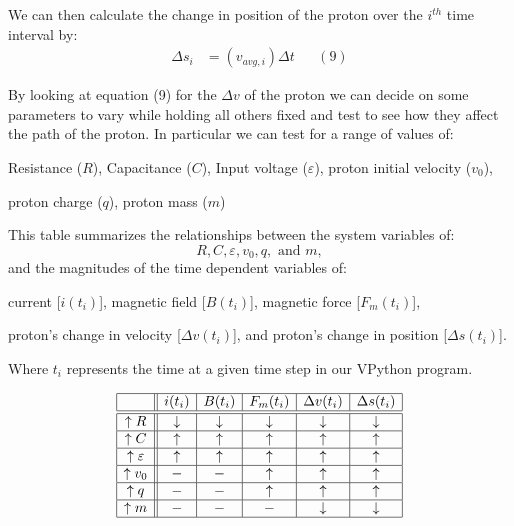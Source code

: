 \documentclass[11pt]{article}
\begin{document}
\vspace{.2in}

\noindent We can then calculate the change in position of the proton over the $i^{th}$ time interval by:
\begin{align*}
\Delta s_i&=\left(v_{avg,i}\right)\Delta t&&(9)
\end{align*}

\vspace{.2in}

\noindent By looking at equation (9) for the $\Delta v$ of the proton we can decide on some parameters to vary while holding all others fixed and test to see how they affect the path of the proton. In particular we can test for a range of values of:
\begin{center}
Resistance ($R$), Capacitance ($C$), Input voltage ($\varepsilon$), proton initial velocity ($v_0$), 

proton charge ($q$), proton mass ($m$)
\end{center}

\vspace{.3in}

\noindent This table summarizes the relationships between the system variables of:
\[
R,C,\varepsilon,v_0,q,\text{ and }m,
\]
\noindent and the magnitudes of the time dependent variables of: 
\begin{center}
current [$i(t_i)$], magnetic field [$B(t_i)$], magnetic force [$F_m(t_i)$], 

proton's change in velocity [$\Delta v(t_i)$], and proton's change in position [$\Delta s(t_i)$]. 
\end{center}


\noindent Where $t_i$ represents the time at a given time step in our VPython program.
\vspace{.3in}

\[
\begin{array}{|c||c|c|c|c|c|}
 \hline
 & i(t_i) & B(t_i) & F_m(t_i) & \Delta v(t_i) & \Delta s(t_i) \\ 
 \hline\hline
 \uparrow R & \downarrow & \downarrow & \downarrow & \downarrow & \downarrow \\
 \hline
 \uparrow C & \uparrow & \uparrow & \uparrow & \uparrow & \uparrow \\
 \hline
 \uparrow \varepsilon & \uparrow & \uparrow & \uparrow & \uparrow & \uparrow \\
 \hline
 \uparrow v_0 &- & - & \uparrow & \uparrow & \uparrow \\
 \hline
 \uparrow q &- & - & \uparrow & \uparrow & \uparrow \\
 \hline
 \uparrow m  &- & - & - & \downarrow & \downarrow \\
 \hline
\end{array}
\]
\vspace{.4in}
\end{document}
